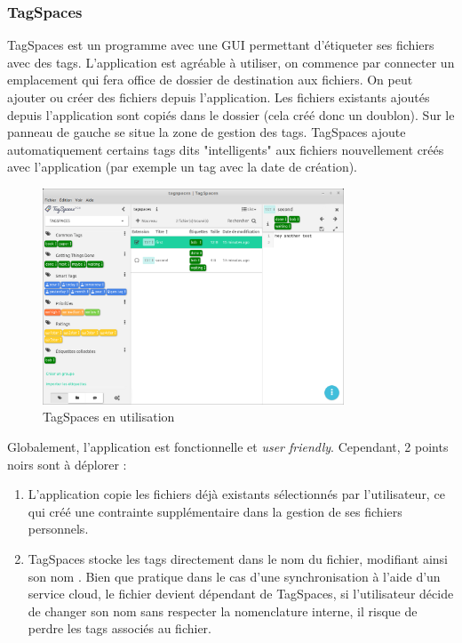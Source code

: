 \documentclass[a4paper, 12pt]{article}
\begin{document}
\subsubsection{TagSpaces}
TagSpaces \cite{ref13} est un programme avec une GUI permettant d'étiqueter ses fichiers avec des tags. 
L'application est agréable à utiliser, on commence par connecter un emplacement qui fera office de dossier de 
destination aux fichiers. On peut ajouter ou créer des fichiers depuis l'application. Les fichiers 
existants ajoutés depuis l'application sont copiés dans le dossier (cela créé donc un doublon). 
Sur le panneau de gauche se situe la zone de gestion des tags. TagSpaces ajoute automatiquement 
certains tags dits "intelligents" aux fichiers nouvellement créés avec l'application (par exemple 
un tag avec la date de création).
\begin{figure}
    \begin{center}
        \includegraphics[width=0.8\textwidth]{images/tagspaces.png}
    \end{center}
    \caption{TagSpaces en utilisation}
    \label{tagspaces}
\end{figure}
Globalement, l'application est fonctionnelle et \textit{user friendly}. Cependant, 2 points noirs 
sont à déplorer :
\begin{enumerate}
    \item L'application copie les fichiers déjà existants sélectionnés par l'utilisateur, ce qui 
        créé une contrainte supplémentaire dans la gestion de ses fichiers personnels.
    \item TagSpaces stocke les tags directement dans le nom du fichier, modifiant ainsi son nom \cite{ref14}.
        Bien que pratique dans le cas d'une synchronisation à l'aide d'un service cloud, 
        le fichier devient dépendant de TagSpaces, si l'utilisateur décide de changer son nom sans 
        respecter la nomenclature interne, il risque de perdre les tags associés au fichier.
\end{enumerate}
\end{document}
